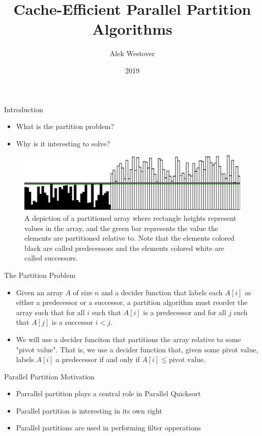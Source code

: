 \documentclass{beamer}
\title{Cache-Efficient Parallel Partition Algorithms}
\author{Alek Westover}
\institute{MIT PRIMES}
\date{2019}
\begin{document}
 
\frame{\titlepage}

\begin{frame}[t]{Introduction}
	\begin{itemize}
		\item What is the partition problem?
		\item Why is it interesting to solve?
	\end{itemize}
	\begin{figure}
		\includegraphics[width=\linewidth]{partitionedArray.png}
		\caption{A depiction of a partitioned array where rectangle heights represent values in the array, and the green bar represents the value the elements are partitioned relative to. Note that the elements colored black are called predecessors and the elements colored white are called successors.}
		\label{fig:partitionedArray}
	\end{figure}
\end{frame}

\begin{frame}[t]{The Partition Problem}
	\begin{itemize}
		\item Given an array $A$ of size $n$ and a decider function that labels each $A[i]$ as either a predecessor or a successor, a partition algorithm must reorder the array such that for all $i$ such that $A[i]$ is a predecessor and for all $j$ such that $A[j]$ is a successor $i < j$.
		\item We will use a decider funciton that partitions the array relative to some "pivot value". That is, we use a decider function that, given some pivot value, labels $A[i]$ a predecessor if and only if $A[i] \le \text{pivot value}$.
\end{itemize}
\end{frame}

\begin{frame}[t]{Parallel Partition Motivation}
	\begin{itemize}
		\item Parrallel partition plays a central role in Parallel Quicksort
		\item Parallel partition is interesting in its own right
		\item Parallel partitions are used in performing filter opperations
\end{itemize}	
\end{frame}
\end{document}
